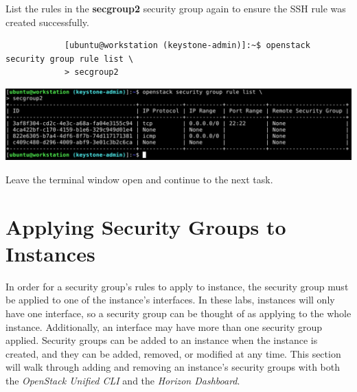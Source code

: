 \documentclass[letterpaper, 12pt]{article}
\begin{document}
\begin{enumerate}
    \begin{labstep}
        List the rules in the \textbf{secgroup2} security group again to ensure the SSH rule was created successfully.
        \begin{lstlisting}
            [ubuntu@workstation (keystone-admin)]:~$ openstack security group rule list \
            > secgroup2
        \end{lstlisting}

        \begin{center}
            \includegraphics[width=\linewidth]{images/part5/step20.png}
        \end{center}
    \end{labstep}

    \begin{labstep}
        Leave the terminal window open and continue to the next task.
    \end{labstep}

\end{enumerate}

\section{Applying Security Groups to Instances}\label{sec:applying-security-groups-to-instances}
In order for a security group's rules to apply to instance, the security group must be applied to one of the instance's interfaces.
In these labs, instances will only have one interface, so a security group can be thought of as applying to the whole instance.
Additionally, an interface may have more than one security group applied.
Security groups can be added to an instance when the instance is created, and they can be added, removed, or modified at any time.
This section will walk through adding and removing an instance's security groups with both the \textit{OpenStack Unified CLI} and the \textit{Horizon Dashboard}.
\end{document}
